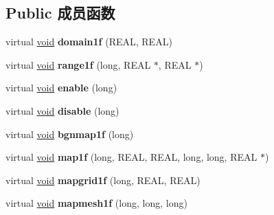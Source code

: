\subsection*{Public 成员函数}
\begin{DoxyCompactItemize}
\item 
\mbox{\label{class_basic_curve_evaluator_ad794c3df1e86460760cb69bbde13508a}} 
virtual \hyperlink{interfacevoid}{void} {\bfseries domain1f} (R\+E\+AL, R\+E\+AL)
\item 
\mbox{\label{class_basic_curve_evaluator_a92d91dc2e88f335d467c9a6ad98c2577}} 
virtual \hyperlink{interfacevoid}{void} {\bfseries range1f} (long, R\+E\+AL $\ast$, R\+E\+AL $\ast$)
\item 
\mbox{\label{class_basic_curve_evaluator_a0ffd91500d70625918819d26fba3eb7f}} 
virtual \hyperlink{interfacevoid}{void} {\bfseries enable} (long)
\item 
\mbox{\label{class_basic_curve_evaluator_a42bcceabaeeec5077406396ea02f2b8e}} 
virtual \hyperlink{interfacevoid}{void} {\bfseries disable} (long)
\item 
\mbox{\label{class_basic_curve_evaluator_a07849ca9499c7267a4d8d9cc3e2eb930}} 
virtual \hyperlink{interfacevoid}{void} {\bfseries bgnmap1f} (long)
\item 
\mbox{\label{class_basic_curve_evaluator_a7090bc1dd12bb7db775721e61bb1e20c}} 
virtual \hyperlink{interfacevoid}{void} {\bfseries map1f} (long, R\+E\+AL, R\+E\+AL, long, long, R\+E\+AL $\ast$)
\item 
\mbox{\label{class_basic_curve_evaluator_a170cca555f3c76f5369dc02fd3d6ca75}} 
virtual \hyperlink{interfacevoid}{void} {\bfseries mapgrid1f} (long, R\+E\+AL, R\+E\+AL)
\item 
\mbox{\label{class_basic_curve_evaluator_a9d3337827f6f4431f16152e7ecc01ed2}} 
virtual \hyperlink{interfacevoid}{void} {\bfseries mapmesh1f} (long, long, long)
\item 
\mbox{\label{class_basic_curve_evaluator_a3b2d04fd8d316bd7d0809f062cbb8fbc}} 

\end{DoxyCompactItemize}
